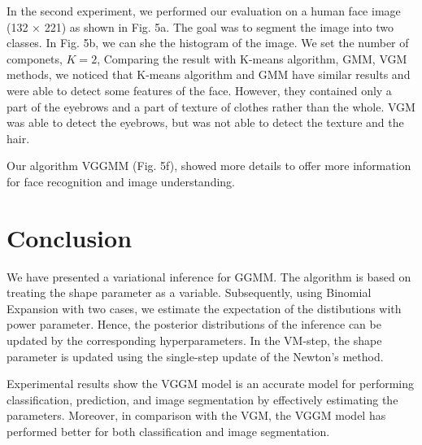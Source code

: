 \documentclass[conference]{IEEEtran}
\begin{document}
In the second experiment, we performed our evaluation on a human face image (132 × 221) as shown in Fig. 5a. The goal was to segment the image into two classes. In Fig. 5b, we can she the histogram of the image. 
We set the number of componets, $K=2$,
Comparing the result with K-means algorithm, GMM, VGM methods, we noticed that K-means algorithm and GMM have similar results and were able to detect some features of the face. However, they contained only a part of the eyebrows and a part of texture of clothes rather than the whole. 
VGM was able to detect the eyebrows, but was not able to detect the texture and the hair. 

Our algorithm VGGMM (Fig. 5f), showed more details to offer more information for face recognition and image understanding.

\section{Conclusion}
We have presented a variational inference for GGMM. The algorithm is based on treating the shape parameter as a variable. Subsequently, using Binomial Expansion with two cases, we estimate the expectation of the distibutions with power parameter. Hence, the posterior distributions of the inference can be updated by the corresponding hyperparameters.
In the VM-step, the shape parameter is updated using the single-step update of the Newton’s method.


Experimental results show the VGGM model is an accurate model for performing classification, prediction, and image segmentation by effectively estimating the parameters.
Moreover, in comparison with the VGM, the VGGM model has performed better for both classification and image segmentation. 

\end{document}
